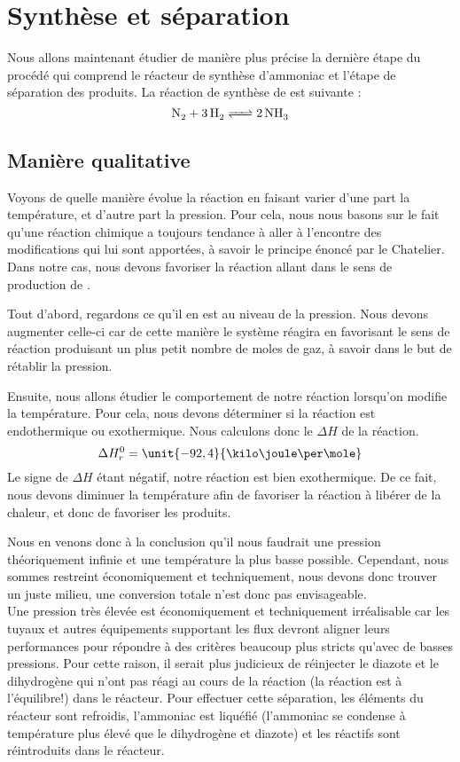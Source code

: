 \documentclass[10pt,a4paper]{article}
\begin{document}
\section{Synthèse  et séparation}

Nous allons maintenant étudier de manière plus précise la dernière étape du procédé qui comprend le réacteur de synthèse d’ammoniac et l'étape de séparation des produits.
La réaction de synthèse de  est suivante :
\[ \ce{N_2 + 3H2 <=> 2NH3} \]

\subsection{Manière qualitative}

Voyons de quelle manière évolue la réaction en faisant varier d'une part la température, et d'autre part la pression. Pour cela, nous nous basons sur le fait qu'une réaction chimique a toujours tendance à   aller à l'encontre des modifications qui lui sont apportées, à savoir le principe énoncé par le Chatelier. Dans notre cas, nous devons favoriser la réaction allant dans le sens de production de .

Tout d'abord, regardons ce qu'il en est au niveau de la pression. Nous devons augmenter celle-ci car de cette manière le système réagira en favorisant le sens de réaction produisant un plus petit nombre de moles de gaz, à savoir  dans le but de rétablir la pression. 

Ensuite, nous allons étudier le comportement de notre réaction lorsqu'on modifie la température. Pour cela, nous devons déterminer si la réaction est endothermique ou exothermique. Nous calculons donc le $\Delta H$  de la réaction.
\[ \Delta H^0_r = \unit{-92,4}{\kilo\joule\per\mole} \]
Le signe de $\Delta H$ étant négatif, notre réaction est bien exothermique. De ce fait, nous devons diminuer la température afin de favoriser la réaction à libérer de la chaleur, et donc de favoriser les produits.

Nous en venons donc à la conclusion qu'il nous faudrait une pression théoriquement infinie et une température la plus basse possible. Cependant, nous sommes restreint économiquement et techniquement, nous devons donc trouver un juste milieu, une conversion totale n'est donc pas envisageable. 
\\

Une pression très élevée est économiquement et techniquement irréalisable car les tuyaux et autres équipements supportant les flux devront aligner leurs performances pour répondre à des critères beaucoup plus stricts qu'avec de basses pressions.
Pour cette raison, il serait plus judicieux de réinjecter  le diazote et le dihydrogène qui n'ont pas réagi au cours de la réaction (la réaction est à l'équilibre!) dans le réacteur. Pour effectuer cette séparation, les éléments du réacteur sont refroidis, l'ammoniac est liquéfié (l'ammoniac se condense à température plus élevé que le dihydrogène et diazote) et les réactifs sont réintroduits dans le réacteur.
\end{document}
